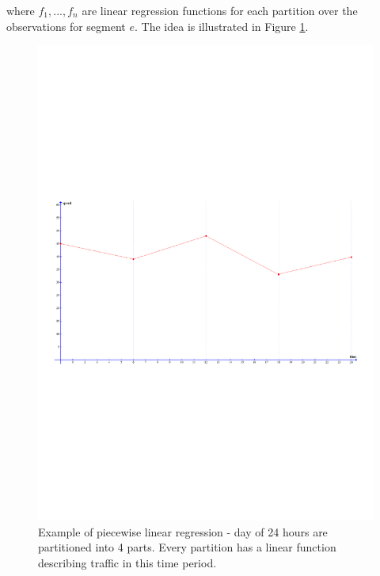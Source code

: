 where $f_1,...,f_n$ are linear regression functions for each partition over the observations for segment $e$. The idea is illustrated in Figure \ref{fig:segmented-regression}.
\begin{figure}
\centering
\includegraphics[trim={0 9cm 0 9cm},clip, width=\textwidth]{figures/piecewise.pdf}
\caption{Example of piecewise linear regression - day of 24 hours are partitioned into 4 parts. Every partition has a linear function describing traffic in this time period.}
\label{fig:segmented-regression}
\end{figure}
